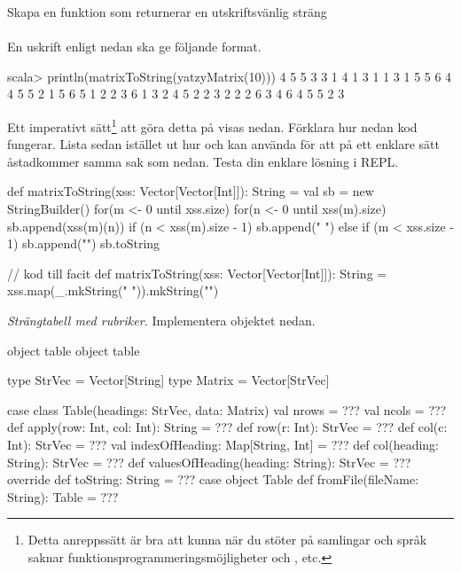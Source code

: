 \Subtask Skapa en funktion som returnerar en utskriftsvänlig sträng \\  \\ En uskrift enligt nedan ska ge följande format. 
\begin{REPL}
scala> println(matrixToString(yatzyMatrix(10)))
4 5 5 3 3
1 4 1 3 1
1 3 1 5 5
6 4 4 5 5
2 1 5 6 5
1 2 2 3 6
1 3 2 4 5
2 2 3 2 2
2 6 3 4 6
4 5 5 2 3

\end{REPL}
Ett imperativt sätt\footnote{Detta anreppssätt är bra att kunna när du stöter på samlingar och språk saknar funktionsprogrammeringsmöjligheter och ,  etc.} att göra detta på visas nedan. Förklara hur nedan kod fungerar. Lista sedan istället ut hur  och  kan använda för att på ett enklare sätt åstadkommer samma sak som nedan. Testa din enklare lösning i REPL.
\begin{Code}
def matrixToString(xss: Vector[Vector[Int]]): String = {
  val sb = new StringBuilder()
  for(m <- 0 until xss.size) {
    for(n <- 0 until xss(m).size) { 
      sb.append(xss(m)(n))
      if (n < xss(m).size - 1) sb.append(" ") 
      else if (m < xss.size - 1) sb.append("\n")
    }
  }
  sb.toString
}
\end{Code}

 
\begin{Code}
// kod till facit
def matrixToString(xss: Vector[Vector[Int]]): String = 
  xss.map(_.mkString(" ")).mkString("\n")
\end{Code}





\Task \emph{Strängtabell med rubriker.} Implementera objektet  nedan.

\begin{ScalaSpec}{object table}
object table {
  type StrVec = Vector[String]
  type Matrix = Vector[StrVec]
  
  case class Table(headings: StrVec, data: Matrix){
    val nrows = ???
    val ncols = ???
    def apply(row: Int, col: Int): String = ???
    def row(r: Int): StrVec = ???
    def col(c: Int): StrVec = ???
    val indexOfHeading: Map[String, Int] = ???
    def col(heading: String): StrVec = ???
    def valuesOfHeading(heading: String): StrVec = ???
    override def toString: String = ???
  }
  case object Table {
    def fromFile(fileName: String): Table = ???
  }
}
\end{ScalaSpec}


